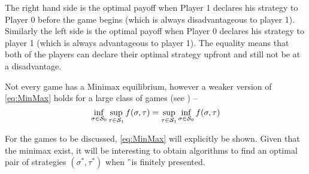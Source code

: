 The right hand side is the optimal payoff when Player 1 declares his strategy to Player 0 before the game begins (which is always disadvantageous to player 1). Similarly the left side is the optimal payoff when Player 0 declares his strategy to player 1 (which is always advantageous to player 1). The equality means that both of the players can declare their optimal strategy upfront and still not be at a disadvantage.

Not every game has a Minimax equilibrium, however a weaker version of \eqref{eq:MinMax} holds for a large class of games (see \cite{roux_equilibria}) --
\[
    \inf_{\sigma \in \mathcal{S}_0} \sup_{\tau \in \mathcal{S}_1} f(\sigma, \tau) = \sup_{\tau \in \mathcal{S}_1} \inf_{\sigma \in \mathcal{S}_0 } f(\sigma,\tau)
\]

For the games to be discussed, \eqref{eq:MinMax} will explicitly be shown. Given that the minimax exist, it will be interesting to obtain algorithms to find an optimal pair of strategies $(\sigma^*,\tau^*)$ when \G\ is finitely presented.

